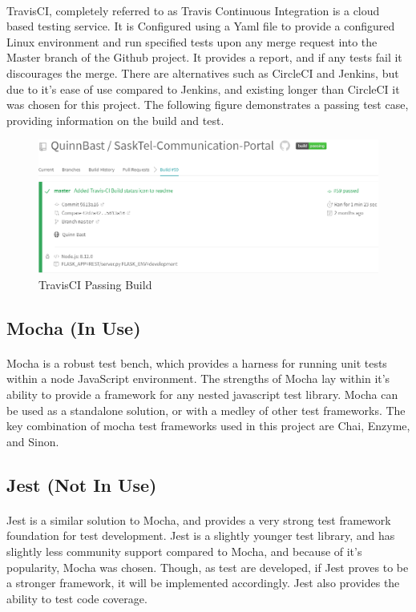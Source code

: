 \documentclass[12pt]{article}
\begin{document}
\paragraph{}	TravisCI, completely referred to as Travis Continuous Integration is a cloud based testing service. It is Configured using a Yaml file to provide a configured Linux environment and run specified tests upon any merge request into the Master branch of the Github project. It provides a report, and if any tests fail it discourages the merge. There are alternatives such as CircleCI and Jenkins, but due to it's ease of use compared to Jenkins, and existing longer than CircleCI it was chosen for this project. The following figure demonstrates a passing test case, providing information on the build and test.
	\begin{figure}[h!]
	\includegraphics[width=\textwidth]{TravisCI.png}
	\caption{TravisCI Passing Build}
	\end{figure}
	\newpage

\subsection{Mocha (In Use)}
\paragraph{}	Mocha is a robust test bench, which provides a harness for running unit tests within a node JavaScript environment. The strengths of Mocha lay within it's ability to provide a framework for any nested javascript test library. Mocha can be used as a standalone solution, or with a medley of other test frameworks. The key combination of mocha test frameworks used in this project are Chai, Enzyme, and Sinon.
 
\subsection{Jest (Not In Use)}
\paragraph{}	 Jest is a similar solution to Mocha, and provides a very strong test framework foundation for test development. Jest is a slightly younger test library, and has slightly less community support compared to Mocha, and because of it's popularity, Mocha was chosen. Though, as test are developed, if Jest proves to be a stronger framework, it will be implemented accordingly. Jest also provides the ability to test code coverage. 
\end{document}
